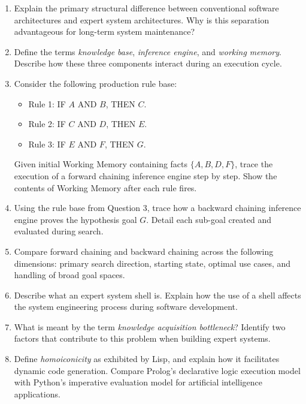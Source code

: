 \documentclass[12pt]{report}
\begin{document}
\begin{enumerate}
    \item Explain the primary structural difference between conventional software architectures and expert system architectures. Why is this separation advantageous for long-term system maintenance?
    \item Define the terms \textit{knowledge base}, \textit{inference engine}, and \textit{working memory}. Describe how these three components interact during an execution cycle.
    \item Consider the following production rule base:
    \begin{itemize}
        \item Rule 1: IF $A$ AND $B$, THEN $C$.
        \item Rule 2: IF $C$ AND $D$, THEN $E$.
        \item Rule 3: IF $E$ AND $F$, THEN $G$.
    \end{itemize}
    Given initial Working Memory containing facts $\{A, B, D, F\}$, trace the execution of a forward chaining inference engine step by step. Show the contents of Working Memory after each rule fires.
    \item Using the rule base from Question 3, trace how a backward chaining inference engine proves the hypothesis goal $G$. Detail each sub-goal created and evaluated during search.
    \item Compare forward chaining and backward chaining across the following dimensions: primary search direction, starting state, optimal use cases, and handling of broad goal spaces.
    \item Describe what an expert system shell is. Explain how the use of a shell affects the system engineering process during software development.
    \item What is meant by the term \textit{knowledge acquisition bottleneck}? Identify two factors that contribute to this problem when building expert systems.
    \item Define \textit{homoiconicity} as exhibited by Lisp, and explain how it facilitates dynamic code generation. Compare Prolog's declarative logic execution model with Python's imperative evaluation model for artificial intelligence applications.
\end{enumerate}
\end{document}
